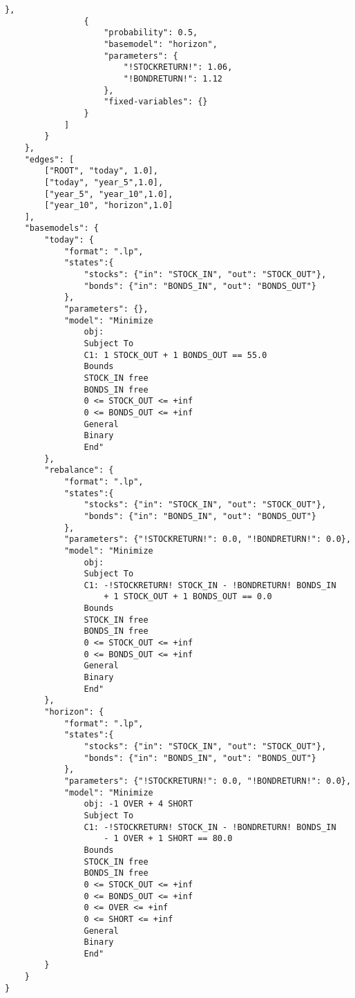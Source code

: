 \documentclass[final,1p,times]{elsarticle}
\begin{document}
\begin{Verbatim}[frame=single,label=asset\_management.sof]
                },
                {
                    "probability": 0.5,
                    "basemodel": "horizon", 
                    "parameters": {
                        "!STOCKRETURN!": 1.06,
                        "!BONDRETURN!": 1.12
                    },
                    "fixed-variables": {}
                }
            ]
        }
    },
    "edges": [
        ["ROOT", "today", 1.0],
        ["today", "year_5",1.0],
        ["year_5", "year_10",1.0],
        ["year_10", "horizon",1.0]
    ],
    "basemodels": {
        "today": {
            "format": ".lp",
            "states":{
                "stocks": {"in": "STOCK_IN", "out": "STOCK_OUT"},
                "bonds": {"in": "BONDS_IN", "out": "BONDS_OUT"}
            },
            "parameters": {},
            "model": "Minimize
                obj: 
                Subject To
                C1: 1 STOCK_OUT + 1 BONDS_OUT == 55.0
                Bounds
                STOCK_IN free
                BONDS_IN free
                0 <= STOCK_OUT <= +inf
                0 <= BONDS_OUT <= +inf
                General
                Binary
                End"
        },
        "rebalance": {
            "format": ".lp",
            "states":{
                "stocks": {"in": "STOCK_IN", "out": "STOCK_OUT"},
                "bonds": {"in": "BONDS_IN", "out": "BONDS_OUT"}
            },
            "parameters": {"!STOCKRETURN!": 0.0, "!BONDRETURN!": 0.0},
            "model": "Minimize
                obj: 
                Subject To
                C1: -!STOCKRETURN! STOCK_IN - !BONDRETURN! BONDS_IN 
                    + 1 STOCK_OUT + 1 BONDS_OUT == 0.0
                Bounds
                STOCK_IN free
                BONDS_IN free
                0 <= STOCK_OUT <= +inf
                0 <= BONDS_OUT <= +inf
                General
                Binary
                End"
        },
        "horizon": {
            "format": ".lp",
            "states":{
                "stocks": {"in": "STOCK_IN", "out": "STOCK_OUT"},
                "bonds": {"in": "BONDS_IN", "out": "BONDS_OUT"}
            },
            "parameters": {"!STOCKRETURN!": 0.0, "!BONDRETURN!": 0.0},
            "model": "Minimize
                obj: -1 OVER + 4 SHORT
                Subject To
                C1: -!STOCKRETURN! STOCK_IN - !BONDRETURN! BONDS_IN 
                    - 1 OVER + 1 SHORT == 80.0
                Bounds
                STOCK_IN free
                BONDS_IN free
                0 <= STOCK_OUT <= +inf
                0 <= BONDS_OUT <= +inf
                0 <= OVER <= +inf
                0 <= SHORT <= +inf
                General
                Binary
                End"
        }
    }
}
\end{Verbatim}
\end{document}
